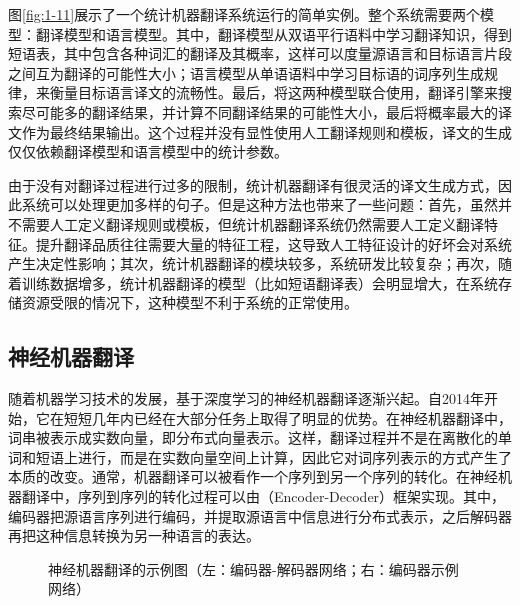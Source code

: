 \parinterval 图\ref{fig:1-11}展示了一个统计机器翻译系统运行的简单实例。整个系统需要两个模型：翻译模型和语言模型。其中，翻译模型从双语平行语料中学习翻译知识，得到短语表，其中包含各种词汇的翻译及其概率，这样可以度量源语言和目标语言片段之间互为翻译的可能性大小；语言模型从单语语料中学习目标语的词序列生成规律，来衡量目标语言译文的流畅性。最后，将这两种模型联合使用，翻译引擎来搜索尽可能多的翻译结果，并计算不同翻译结果的可能性大小，最后将概率最大的译文作为最终结果输出。这个过程并没有显性使用人工翻译规则和模板，译文的生成仅仅依赖翻译模型和语言模型中的统计参数。

\parinterval 由于没有对翻译过程进行过多的限制，统计机器翻译有很灵活的译文生成方式，因此系统可以处理更加多样的句子。但是这种方法也带来了一些问题：首先，虽然并不需要人工定义翻译规则或模板，但统计机器翻译系统仍然需要人工定义翻译特征。提升翻译品质往往需要大量的特征工程，这导致人工特征设计的好坏会对系统产生决定性影响；其次，统计机器翻译的模块较多，系统研发比较复杂；再次，随着训练数据增多，统计机器翻译的模型（比如短语翻译表）会明显增大，在系统存储资源受限的情况下，这种模型不利于系统的正常使用。


\subsection{神经机器翻译}

\parinterval 随着机器学习技术的发展，基于深度学习的神经机器翻译逐渐兴起。自2014年开始，它在短短几年内已经在大部分任务上取得了明显的优势\cite{NIPS2014_5346,bahdanau2014neural}。在神经机器翻译中，词串被表示成实数向量，即分布式向量表示。这样，翻译过程并不是在离散化的单词和短语上进行，而是在实数向量空间上计算，因此它对词序列表示的方式产生了本质的改变。通常，机器翻译可以被看作一个序列到另一个序列的转化。在神经机器翻译中，序列到序列的转化过程可以由{\small{}}（Encoder-Decoder）框架实现。其中，编码器把源语言序列进行编码，并提取源语言中信息进行分布式表示，之后解码器再把这种信息转换为另一种语言的表达。

\begin{figure}[htp]
    \centering

    \caption{神经机器翻译的示例图（左：编码器-解码器网络；右：编码器示例网络）}
    \label{fig:1-12}
\end{figure}

